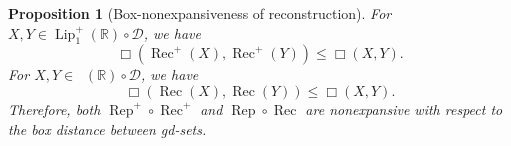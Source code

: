 \documentclass{amsart}
\theoremstyle{plain}
\newtheorem{proposition}[theorem]{Proposition}
\theoremstyle{definition}
\theoremstyle{remark}
\newcommand{\R}{\mathbb{R}}
\newcommand{\D}{\mathcal{D}}
\newcommand{\Lup}{\operatorname{Lip}^{+}_{1}(\R)}
\DeclareMathOperator{\lipone}{Lip_1}
\begin{document}
\begin{proposition}[Box-nonexpansiveness of reconstruction]
\label{prop:right-adjoint-box-nonexpansive}
For $X,Y\in\Lup\circ\D$, we have
\begin{equation}
\label{eq:xp-box-nonexpansive}
\Box(\operatorname{Rec}^{+}(X),\operatorname{Rec}^{+}(Y))\leq\Box(X,Y).
\end{equation}
For $X,Y\in\lipone(\R)\circ\D$, we have
\begin{equation}
\label{eq:x-box-nonexpansive}
\Box(\operatorname{Rec}(X),\operatorname{Rec}(Y))\leq\Box(X,Y).
\end{equation}
Therefore, both $\operatorname{Rep}^{+}\circ\operatorname{Rec}^{+}$ and $\operatorname{Rep}\circ\operatorname{Rec}$ are nonexpansive with respect to the box distance between gd-sets.
\end{proposition}
\end{document}
